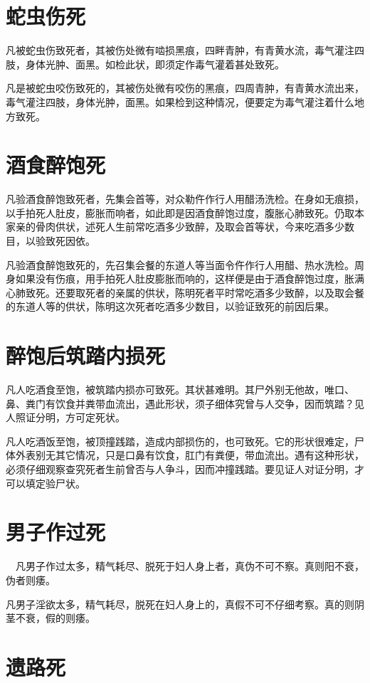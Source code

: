 \documentclass[12pt,UTF8]{ctexbook}
\begin{document}
\chapter{蛇虫伤死}

凡被蛇虫伤致死者，其被伤处微有啮损黑痕，四畔青肿，有青黄水流，毒气灌注四肢，身体光肿、面黑。如检此状，即须定作毒气灌着甚处致死。


凡是被蛇虫咬伤致死的，其被伤处微有咬伤的黑痕，四周青肿，有青黄水流出来，毒气灌注四肢，身体光肿，面黑。如果检到这种情况，便要定为毒气灌注着什么地方致死。


\chapter{酒食醉饱死}
凡验酒食醉饱致死者，先集会首等，对众勒仵作行人用醋汤洗检。在身如无痕损，以手拍死人肚皮，膨胀而响者，如此即是因酒食醉饱过度，腹胀心肺致死。仍取本家亲的骨肉供状，述死人生前常吃酒多少致醉，及取会首等状，今来吃酒多少数目，以验致死因依。


凡验酒食醉饱致死的，先召集会餐的东道人等当面令仵作行人用醋、热水洗检。周身如果没有伤痕，用手拍死人肚皮膨胀而响的，这样便是由于酒食醉饱过度，胀满心肺致死。还要取死者的亲属的供状，陈明死者平时常吃酒多少致醉，以及取会餐的东道人等的供状，陈明这次死者吃酒多少数目，以验证致死的前因后果。


\chapter{醉饱后筑踏内损死}

凡人吃酒食至饱，被筑踏内损亦可致死。其状甚难明。其尸外别无他故，唯口、鼻、粪门有饮食并粪带血流出，遇此形状，须子细体究曾与人交争，因而筑踏？见人照证分明，方可定死状。


凡人吃酒饭至饱，被顶撞践踏，造成内部损伤的，也可致死。它的形状很难定，尸体外表别无其它情况，只是口鼻有饮食，肛门有粪便，带血流出。遇有这种形状，必须仔细观察查究死者生前曾否与人争斗，因而冲撞践踏。要见证人对证分明，才可以填定验尸状。


\chapter{男子作过死}

　凡男子作过太多，精气耗尽、脱死于妇人身上者，真伪不可不察。真则阳不衰，伪者则痿。


凡男子淫欲太多，精气耗尽，脱死在妇人身上的，真假不可不仔细考察。真的则阴茎不衰，假的则痿。


\chapter{遗路死}
\end{document}
